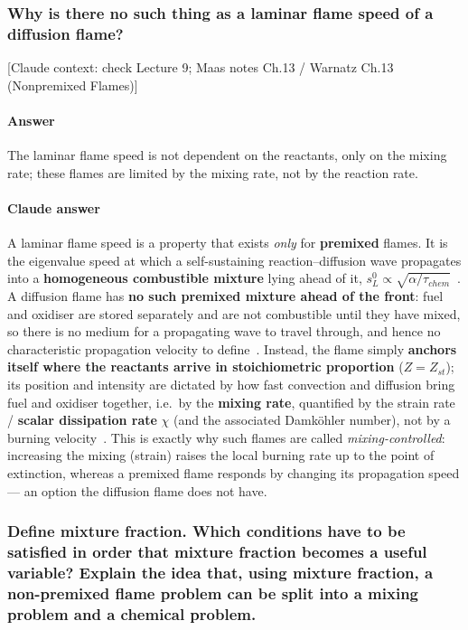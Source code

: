 \subsubsection{Why is there no such thing as a laminar flame speed of a diffusion flame?}

{\color{gray}\footnotesize [Claude context: check Lecture 9; Maas notes Ch.13 / Warnatz Ch.13 (Nonpremixed Flames)]}

\paragraph{Answer}

The laminar flame speed is not dependent on the reactants, only on the mixing rate; these flames are limited by the mixing rate, not by the reaction rate.

{\color{istblue}
\paragraph{Claude answer}
A laminar flame speed is a property that exists \emph{only} for \textbf{premixed} flames. It is the eigenvalue speed at which a self-sustaining reaction--diffusion wave propagates into a \textbf{homogeneous combustible mixture} lying ahead of it, $s_L^0\propto\sqrt{\alpha/\tau_{chem}}$~\cite{lecture9,warnatz2006combustion}. A diffusion flame has \textbf{no such premixed mixture ahead of the front}: fuel and oxidiser are stored separately and are not combustible until they have mixed, so there is no medium for a propagating wave to travel through, and hence no characteristic propagation velocity to define~\cite{lecture9,glassman2014combustion}. Instead, the flame simply \textbf{anchors itself where the reactants arrive in stoichiometric proportion} ($Z=Z_{st}$); its position and intensity are dictated by how fast convection and diffusion bring fuel and oxidiser together, i.e.\ by the \textbf{mixing rate}, quantified by the strain rate / \textbf{scalar dissipation rate} $\chi$ (and the associated Damk\"ohler number), not by a burning velocity~\cite{lecture9,poinsot2012theoretical,warnatz2006combustion}. This is exactly why such flames are called \emph{mixing-controlled}: increasing the mixing (strain) raises the local burning rate up to the point of extinction, whereas a premixed flame responds by changing its propagation speed --- an option the diffusion flame does not have.
}




\subsubsection{Define mixture fraction. Which conditions have to be satisfied in order that mixture fraction becomes a useful variable? Explain the idea that, using mixture fraction, a non-premixed flame problem can be split into a mixing problem and a chemical problem.}

